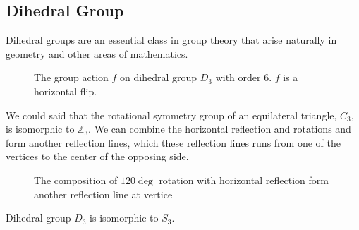\subsection{Dihedral Group}

Dihedral groups are an essential class in group theory that arise naturally in geometry and other areas of mathematics.

\begin{figure}[ht]
    \centering
    \caption{The group action $f$ on dihedral group $D_3$ with order 6. $f$ is a horizontal flip.}
\end{figure}

We could said that the rotational symmetry group of an equilateral triangle, $C_3$, is isomorphic to
$\mathbb{Z}_3$. We can combine the horizontal reflection and rotations and form another reflection lines, 
which these reflection lines runs from one of the vertices to the center of the opposing side.

\begin{figure}[ht]
    \centering
    \caption{The composition of $120\deg$ rotation with horizontal reflection form another reflection line at vertice}
\end{figure}

\begin{lemma}
    Dihedral group $D_3$ is isomorphic to $S_3$.
\end{lemma}

